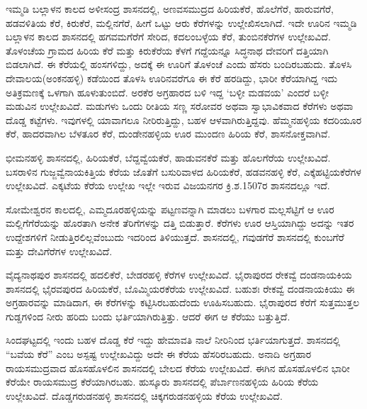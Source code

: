 ಇಮ್ಮಡಿ ಬಲ್ಲಾಳನ ಕಾಲದ ಅಳೀಸಂದ್ರ ಶಾಸನದಲ್ಲಿ, ಅಣವಸಮುದ್ರದ ಹಿರಿಯಕೆರೆ, ಹೊಲೆಗೆರೆ, ಹಾರುವಗೆರೆ, ಹಡವಳಿತಿಯ ಕೆರೆ, ಕಿರುಕೆರೆ, ಮಲ್ಲಿನಗೆರೆ, ಹೀಗೆ ಒಟ್ಟು ಆರು ಕೆರೆಗಳನ್ನು ಉಲ್ಲೇಖಿಸಲಾಗಿದೆ. ಇದೇ ಊರಿನ ಇಮ್ಮಡಿ ಬಲ್ಲಾಳನ ಕಾಲದ ಶಾಸನದಲ್ಲಿ ಹಗವಮಗೆರೆಗೆ ಸೇರಿದ, ಕದಲಂಬಳ್ಳೆಯ ಕೆರೆ, ತುಂಬಿನಕೆರೆಗಳ ಉಲ್ಲೇಖವಿದೆ. ತೊಳಂಚೆಯ ಗ್ರಾಮದ ಹಿರಿಯ ಕೆರೆ ಮತ್ತು ಕಿರುಕೆರೆಯ ಕೆಳಗೆ ಗದ್ದೆಯನ್ನೂ ಸಿದ್ಧನಾಥ ದೇವರಿಗೆ ದತ್ತಿಯಾಗಿ ಬಿಡಲಾಗಿದೆ. ಈ ಕೆರೆಯಲ್ಲಿ ಹಂಸಗಳಿದ್ದು, ಅದಕ್ಕೆ ಈ ಊರಿಗೆ ತೊಳಂಚೆ ಎಂದು ಹೆಸರು ಬಂದಿರಬಹುದು. ತೊಳಸಿ ದೇವಾಲಯ(ಅಂಕನಹಳ್ಳಿ) ಕಡೆಯಿಂದ ತೊಳಸಿ ಊರಿನವರೆಗೂ ಈ ಕೆರೆ ಹರಡಿದ್ದು, ಭಾರೀ ಕೆರೆಯಾಗಿದ್ದ ಇದು ಅತಿಕ್ರಮಣಕ್ಕೆ ಒಳಗಾಗಿ ಹೂಳುತುಂಬಿದೆ. ಅರಕೆರ ಅಗ್ರಹಾರದ ಬಳಿ ಇದ್ದ ‘ಬಳ್ಳೀ ಮಡವಯ’ ಎಂದರೆ ಬಳ್ಳೀ ಮಡುವಿನ ಉಲ್ಲೇಖವಿದೆ. ಮಡುಗಳು ಒಂದು ರೀತಿಯ ಸಣ್ಣ ಸರೋವರ ಅಥವಾ ಸ್ವಾಭಾವಿಕವಾದ ಕೆರೆಗಳು ಅಥವಾ ದೊಡ್ಡ ಕಟ್ಟೆಗಳು. ಇವುಗಳಲ್ಲಿ ಯಾವಾಗಲೂ ನೀರಿರುತ್ತಿದ್ದು, ಬಹಳ ಆಳವಾಗಿರುತ್ತಿದ್ದವು. ಹೆಮ್ಮನಹಳ್ಳಿಯ ಕದರಿಯೂರ ಕೆರೆ, ಹಾದರವಾಗಿಲ ಬೆಳತೂರ ಕೆರೆ, ದುಂಡೇನಹಳ್ಳಿಯ ಊರ ಮುಂದಣ ಹಿರಿಯ ಕೆರೆ, ಶಾಸನೋಕ್ತವಾಗಿವೆ.

ಭೀಮನಹಳ್ಳಿ ಶಾಸನದಲ್ಲಿ, ಹಿರಿಯಕೆರೆ, ಬೆದ್ದವ್ವೆಯಕೆರೆ, ಹಾಡುವನಕೆರೆ ಮತ್ತು ಹೊಲಗೆರೆಯ ಉಲ್ಲೇಖವಿದೆ. ಬಸರಾಳಿನ ಗುಜ್ಜವ್ವೆನಾಯಕಿತ್ತಿಯ ಕೆರೆಯ ಜೊತೆಗೆ ಬಸುರಿವಾಳದ ಹಿರಿಯಕೆರೆ, ಹಡವನಹಳ್ಳಿ ಕೆರೆ, ಎಕ್ಕೆಹಟ್ಟಿಯಕೆರೆಗಳ ಉಲ್ಲೇಖವಿದೆ. ಎಕ್ಕಟೆಯ ಕೆರೆಯ ಉಲ್ಲೇಖ ಇಲ್ಲೇ ಇರುವ ವಿಜಯನಗರ ಕ್ರಿ.ಶ.1507ರ ಶಾಸನದಲ್ಲೂ ಇದೆ.

ಸೋಮೇಶ್ವರನ ಕಾಲದಲ್ಲಿ, ಎಮ್ಮದೂರಹಳ್ಳಿಯನ್ನು ಪಟ್ಟಣವನ್ನಾಗಿ ಮಾಡಲು ಬಳಗಾರ ಮಲ್ಲಸೆಟ್ಟಿಗೆ ಆ ಊರ ಮಲ್ಲಿಗೆಗೆರೆಯನ್ನು ಹೊರತಾಗಿ ಅನೇಕ ತೆರಿಗೆಗಳನ್ನು ದತ್ತಿ ಬಿಡುತ್ತಾರೆ. ಕೆರೆಗಳು ಊರ ಆಸ್ತಿಯಾಗಿದ್ದು ಅದನ್ನು ಇತರ ಉದ್ದೇಶಗಳಿಗೆ ನೀಡುತ್ತಿರಲಿಲ್ಲವೆಂಬುದು ಇದರಿಂದ ತಿಳಿಯುತ್ತದೆ. ಶಾಸನದಲ್ಲಿ, ಗವುಡಗೆರೆ ಶಾಸನದಲ್ಲಿ ಕುಂಬಗೆರೆ ಮತ್ತು ದೇವಿಗೆರೆಗಳ ಉಲ್ಲೇಖವಿದೆ.

ವೈದ್ಯನಾಥಪುರ ಶಾಸನದಲ್ಲಿ ಹದಲಿಕೆರೆ, ಬೇಡರಹಳ್ಳಿ ಕೆರೆಗಳ ಉಲ್ಲೇಖವಿದೆ. ಭೈರಾಪುರದ ರೇಕವ್ವೆ ದಂಡನಾಯಕಿಯ ಶಾಸನದಲ್ಲಿ ಭೈರವಪುರದ ಹಿರಿಯಕೆರೆ, ಬೊಮ್ಮಿಯರಕೆರೆಯ ಉಲ್ಲೇಖವಿದೆ. ಬಹುಶಃ ರೇಕವ್ವೆ ದಂಡನಾಯಕಿಯು ಈ ಅಗ್ರಹಾರವನ್ನು ಮಾಡಿದಾಗ, ಈ ಕೆರೆಗಳನ್ನು ಕಟ್ಟಿಸಿರಬಹುದೆಂದು ಊಹಿಸಬಹುದು. ಭೈರಾಪುರದ ಕೆರೆಗೆ ಸುತ್ತಮುತ್ತಲ ಗುಡ್ಡಗಳಿಂದ ನೀರು ಹರಿದು ಬಂದು ಭರ್ತಿಯಾಗಿರುತ್ತಿತ್ತು. ಆದರೆ ಈಗ ಆ ಕೆರೆಯು ಬತ್ತುತ್ತಿದೆ.

ಸಿಂದಘಟ್ಟದಲ್ಲಿ ಇಂದು ಬಹಳ ದೊಡ್ಡ ಕೆರೆ ಇದ್ದು ಹೇಮಾವತಿ ನಾಲೆ ನೀರಿನಿಂದ ಭರ್ತಿಯಾಗುತ್ತದೆ. ಶಾಸನದಲ್ಲಿ “ಬವೆಯ ಕೆರೆ” ಎಂಬ ಅಸ್ಪಷ್ಟ ಉಲ್ಲೇಖವಿದ್ದು ಅದೇ ಈ ಕೆರೆಯ ಹೆಸರಿರಬಹುದು. ಅನಾದಿ ಅಗ್ರಹಾರ ರಾಯಸಮುದ್ರವಾದ ಹೊಸಹೊಳಲಿನ ಶಾಸನದಲ್ಲಿ ಬೇಲದ ಕೆರೆಯ ಉಲ್ಲೇಖವಿದೆ. ಈಗಿನ ಹೊಸಹೊಳಲಿನ ಭಾರೀ ಕೆರೆಯೇ ರಾಯಸಮುದ್ರ ಕೆರೆಯಾಗಿರಬಹು. ಹುಸ್ಕೂರು ಶಾಸನದಲ್ಲಿ ಪೆರ್ಬಾಣನಹಳ್ಳಿಯ ಹಿರಿಯ ಕೆರೆಯ ಉಲ್ಲೇಖವಿದೆ. ದೊಡ್ಡಗರುಡನಹಳ್ಳಿ ಶಾಸನದಲ್ಲಿ ಚಿಕ್ಕಗರುಡನಹಳ್ಳಿಯ ಕೆರೆಯ ಉಲ್ಲೇಖವಿದೆ.


